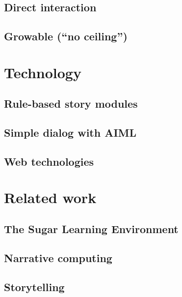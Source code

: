 \documentclass{acm_proc_article-sp}
\begin{document}
\subsection{Direct interaction}
\subsection{Growable (``no ceiling'')}


\section{Technology}
\subsection{Rule-based story modules}
\subsection{Simple dialog with AIML}
\subsection{Web technologies}

\section{Related work}\label{sec:related}
\cite{chang:tinkrbook}
\subsection{The Sugar Learning Environment}
\subsection{Narrative computing}
\subsection{Storytelling}
\end{document}
